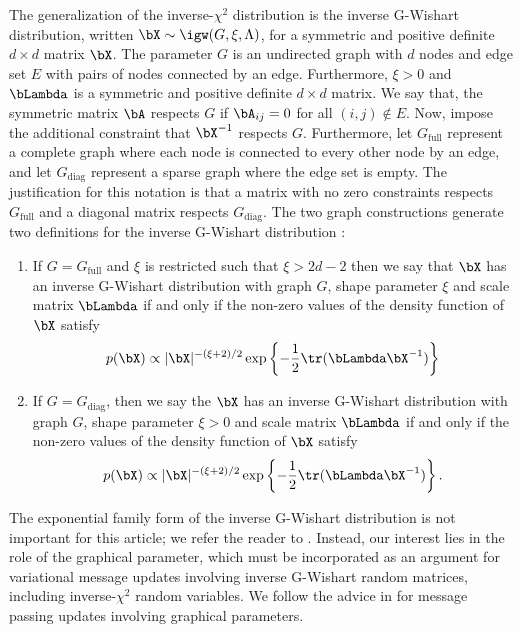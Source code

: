 \documentclass[12pt]{article}
\theoremstyle{plain}
\theoremstyle{definition}
\theoremstyle{remark}
\begin{document}
The generalization of the inverse-$\chi^2$ distribution is the inverse G-Wishart distribution, written $\bX \sim \igw (G, \xi, \Lambda)$,
for a symmetric and positive definite $d \times d$ matrix $\bX$.
The parameter $G$ is an undirected graph with $d$ nodes and edge
set $E$ with pairs of nodes connected by an edge. Furthermore, $\xi > 0$ and
$\bLambda$ is a symmetric and positive definite $d \times d$ matrix.
We say that, the symmetric matrix $\bA$ respects $G$ if $\bA_{ij} = 0$
for all $( i, j ) \notin E$. Now, impose the additional constraint that  $\bX^{-1}$ respects $G$. Furthermore, let $G_{\text{full}}$ represent a
complete graph where each node is connected
to every other node by an edge, and let $G_{\text{diag}}$ represent a sparse graph where the edge set is empty.
The justification for this notation is that a matrix with no zero constraints respects $G_{\text{full}}$ and a diagonal
matrix respects $G_{\text{diag}}$.
The two graph constructions generate two definitions for the inverse G-Wishart distribution \cite[Definition~3]{maestrini20}:

\begin{enumerate}[label={(\alph*)}]
	\item If $G = G_{\text{full}}$ and $\xi$ is restricted such that $\xi > 2d - 2$ then we say that $\bX$ has an inverse G-Wishart
	distribution with graph $G$, shape parameter $\xi$ and scale matrix $\bLambda$ if and only if the non-zero
	values of the density function of $\bX$ satisfy
		\[
			p (\bX) \propto |\bX|^{-(\xi + 2)/2} \exp \left\{ -\frac12 \tr (\bLambda \bX^{-1}) \right\}
		\]
	\item If $G = G_{\text{diag}}$, then we say the $\bX$ has an inverse G-Wishart
	distribution with graph $G$, shape parameter $\xi > 0$ and scale matrix $\bLambda$ if and only if the non-zero
	values of the density function of $\bX$ satisfy
		\[
			p (\bX) \propto |\bX|^{-(\xi + 2)/2} \exp \left\{ -\frac12 \tr (\bLambda \bX^{-1}) \right\}.
		\]
\end{enumerate}

The exponential family form of the inverse G-Wishart distribution is not important for this article; we refer the reader to
. Instead, our interest lies in the role of the graphical parameter, which must be
incorporated as an argument for variational message updates involving inverse G-Wishart random matrices, including
inverse-$\chi^2$ random variables. We follow the advice in  for message passing
updates involving graphical parameters.
\end{document}
